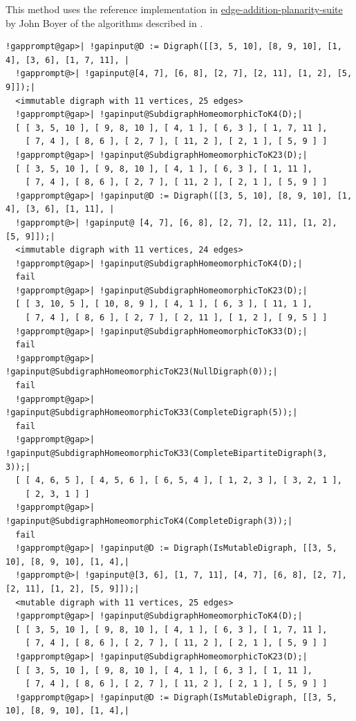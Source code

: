 \documentclass[a4paper,11pt]{report}
\begin{document}
{{{ This method uses the reference implementation in \href{https://github.com/graph-algorithms/edge-addition-planarity-suite} {edge-addition-planarity-suite}  by John Boyer of the algorithms described in \cite{BM06}. 
\begin{Verbatim}[commandchars=!@|,fontsize=\small,frame=single,label=Example]
  !gapprompt@gap>| !gapinput@D := Digraph([[3, 5, 10], [8, 9, 10], [1, 4], [3, 6], [1, 7, 11], |
  !gapprompt@>| !gapinput@[4, 7], [6, 8], [2, 7], [2, 11], [1, 2], [5, 9]]);|
  <immutable digraph with 11 vertices, 25 edges>
  !gapprompt@gap>| !gapinput@SubdigraphHomeomorphicToK4(D);|
  [ [ 3, 5, 10 ], [ 9, 8, 10 ], [ 4, 1 ], [ 6, 3 ], [ 1, 7, 11 ], 
    [ 7, 4 ], [ 8, 6 ], [ 2, 7 ], [ 11, 2 ], [ 2, 1 ], [ 5, 9 ] ]
  !gapprompt@gap>| !gapinput@SubdigraphHomeomorphicToK23(D);|
  [ [ 3, 5, 10 ], [ 9, 8, 10 ], [ 4, 1 ], [ 6, 3 ], [ 1, 11 ], 
    [ 7, 4 ], [ 8, 6 ], [ 2, 7 ], [ 11, 2 ], [ 2, 1 ], [ 5, 9 ] ]
  !gapprompt@gap>| !gapinput@D := Digraph([[3, 5, 10], [8, 9, 10], [1, 4], [3, 6], [1, 11], |
  !gapprompt@>| !gapinput@ [4, 7], [6, 8], [2, 7], [2, 11], [1, 2], [5, 9]]);|
  <immutable digraph with 11 vertices, 24 edges>
  !gapprompt@gap>| !gapinput@SubdigraphHomeomorphicToK4(D);|
  fail
  !gapprompt@gap>| !gapinput@SubdigraphHomeomorphicToK23(D);|
  [ [ 3, 10, 5 ], [ 10, 8, 9 ], [ 4, 1 ], [ 6, 3 ], [ 11, 1 ], 
    [ 7, 4 ], [ 8, 6 ], [ 2, 7 ], [ 2, 11 ], [ 1, 2 ], [ 9, 5 ] ]
  !gapprompt@gap>| !gapinput@SubdigraphHomeomorphicToK33(D);|
  fail
  !gapprompt@gap>| !gapinput@SubdigraphHomeomorphicToK23(NullDigraph(0));|
  fail
  !gapprompt@gap>| !gapinput@SubdigraphHomeomorphicToK33(CompleteDigraph(5));|
  fail
  !gapprompt@gap>| !gapinput@SubdigraphHomeomorphicToK33(CompleteBipartiteDigraph(3, 3));|
  [ [ 4, 6, 5 ], [ 4, 5, 6 ], [ 6, 5, 4 ], [ 1, 2, 3 ], [ 3, 2, 1 ], 
    [ 2, 3, 1 ] ]
  !gapprompt@gap>| !gapinput@SubdigraphHomeomorphicToK4(CompleteDigraph(3));|
  fail
  !gapprompt@gap>| !gapinput@D := Digraph(IsMutableDigraph, [[3, 5, 10], [8, 9, 10], [1, 4],|
  !gapprompt@>| !gapinput@[3, 6], [1, 7, 11], [4, 7], [6, 8], [2, 7], [2, 11], [1, 2], [5, 9]]);|
  <mutable digraph with 11 vertices, 25 edges>
  !gapprompt@gap>| !gapinput@SubdigraphHomeomorphicToK4(D);|
  [ [ 3, 5, 10 ], [ 9, 8, 10 ], [ 4, 1 ], [ 6, 3 ], [ 1, 7, 11 ], 
    [ 7, 4 ], [ 8, 6 ], [ 2, 7 ], [ 11, 2 ], [ 2, 1 ], [ 5, 9 ] ]
  !gapprompt@gap>| !gapinput@SubdigraphHomeomorphicToK23(D);|
  [ [ 3, 5, 10 ], [ 9, 8, 10 ], [ 4, 1 ], [ 6, 3 ], [ 1, 11 ], 
    [ 7, 4 ], [ 8, 6 ], [ 2, 7 ], [ 11, 2 ], [ 2, 1 ], [ 5, 9 ] ]
  !gapprompt@gap>| !gapinput@D := Digraph(IsMutableDigraph, [[3, 5, 10], [8, 9, 10], [1, 4],|

\end{Verbatim}}}}
\end{document}
